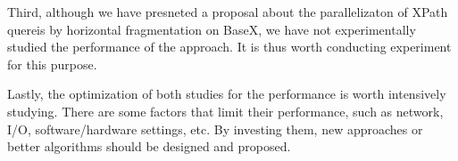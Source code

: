 Third, although we have presneted a proposal about the parallelizaton of XPath 
quereis by horizontal fragmentation on BaseX, we have not experimentally studied 
the performance of the approach. It is thus worth conducting experiment for this 
purpose.

Lastly, the optimization of both studies for the performance is worth
intensively studying. There are some factors that limit their performance, such
as network, I/O, software/hardware settings, etc. By investing them, new
approaches or better algorithms should be designed and proposed.

